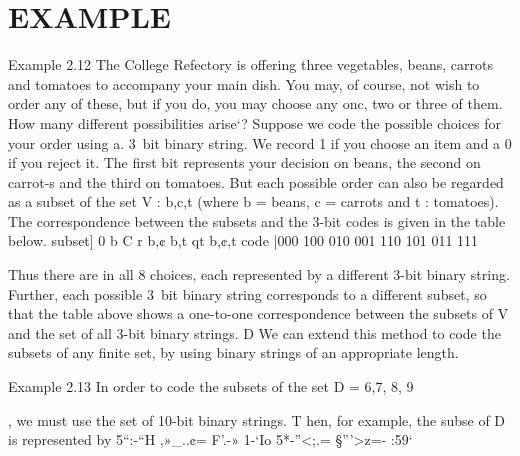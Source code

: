 {{{{%
\section{EXAMPLE}
Example 2.12 The College Refectory is offering three vegetables, beans, carrots and tomatoes to
accompany your main dish. You may, of course, not wish to order any of these, but if you do, you
may choose any onc, two or three of them. How many different possibilities arise‘?
Suppose we code the possible choices for your order using a. 3~bit binary string. We record 1 if you
choose an item and a 0 if you reject it. The ﬁrst bit represents your decision on beans, the second
on carrot-s and the third on tomatoes. But each possible order can also be regarded as a subset
of the set V : {b,c,t} (where b = beans, c = carrots and t : tomatoes). The correspondence
between the subsets and the 3-bit codes is given in the table below.
subset] 0 {b} {C} {r} {b,¢} {b,t} {qt} {b,¢,t}
code |000 100 010 001 110 101 011 111

Thus there are in all 8 choices, each represented by a different 3-bit binary string. Further, each
possible 3~bit binary string corresponds to a different subset, so that the table above shows a
one-to-one correspondence between the subsets of V and the set of all 3-bit binary strings. D
We can extend this method to code the subsets of any ﬁnite set, by using binary strings of an
appropriate length.
\smallskip 
\smallskip 


Example 2.13 In order to code the subsets of the set D = 6,7, 8, 9}, we must use
the set of 10-bit binary strings. T hen, for example, the subse of D is represented by
5“:-“H
,»_..¢=
F’.-»
1-‘Io
5*-”<;.=
§”'>z=-
:59‘

}}}
